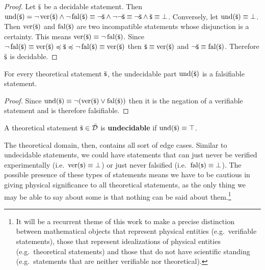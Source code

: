 \begin{mathSection}
\begin{proof}
			Let $\bar{\mathsf{s}}$ be a decidable statement. Then $\operatorname{und}(\bar{\mathsf{s}}) = \neg \operatorname{ver}(\bar{\mathsf{s}}) \wedge \neg \operatorname{fal}(\bar{\mathsf{s}}) \equiv \neg \bar{\mathsf{s}} \wedge \neg \neg \bar{\mathsf{s}} \equiv \neg \bar{\mathsf{s}} \wedge \bar{\mathsf{s}} \equiv \bot$. Conversely, let $\operatorname{und}(\bar{\mathsf{s}}) \equiv \bot$. Then $\operatorname{ver}(\bar{\mathsf{s}})$ and $\operatorname{fal}(\bar{\mathsf{s}})$ are two incompatible statements whose disjunction is a certainty. This means $\operatorname{ver}(\bar{\mathsf{s}}) \equiv \neg \operatorname{fal}(\bar{\mathsf{s}})$. Since $\neg \operatorname{fal}(\bar{\mathsf{s}}) \equiv \operatorname{ver}(\bar{\mathsf{s}}) \preccurlyeq \bar{\mathsf{s}} \preccurlyeq \neg \operatorname{fal}(\bar{\mathsf{s}}) \equiv \operatorname{ver}(\bar{\mathsf{s}})$ then $\bar{\mathsf{s}} \equiv \operatorname{ver}(\bar{\mathsf{s}})$ and $\neg\bar{\mathsf{s}} \equiv \operatorname{fal}(\bar{\mathsf{s}})$. Therefore $\bar{\mathsf{s}}$ is decidable.	
		\end{proof}
		
		\begin{coro}
			For every theoretical statement $\bar{\mathsf{s}}$, the undecidable part $\operatorname{und}(\bar{\mathsf{s}})$ is a falsifiable statement.
		\end{coro}
		
		\begin{proof}
			Since $\operatorname{und}(\bar{\mathsf{s}}) \equiv \neg (\operatorname{ver}(\bar{\mathsf{s}}) \vee \operatorname{fal}(\bar{\mathsf{s}}))$ then it is the negation of a verifiable statement and is therefore falsifiable.
		\end{proof}
		
		\begin{defn}
			A theoretical statement $\bar{\mathsf{s}} \in \bar{\mathcal{D}}$ is \textbf{undecidable} if $\operatorname{und}(\bar{\mathsf{s}}) \equiv \top$.
		\end{defn}
	\end{mathSection}
	
	The theoretical domain, then, contains all sort of edge cases. Similar to undecidable statements, we could have statements that can just never be verified experimentally (i.e.~$\operatorname{ver}(\mathsf{s}) \equiv \bot$) or just never falsified (i.e.~$\operatorname{fal}(\mathsf{s}) \equiv \bot$). The possible presence of these types of statements means we have to be cautious in giving physical significance to all theoretical statements, as the only thing we may be able to say about some is that nothing can be said about them.\footnote{It will be a recurrent theme of this work to make a precise distinction between mathematical objects that represent physical entities (e.g.~verifiable statements), those that represent idealizations of physical entities (e.g.~theoretical statements) and those that do not have scientific standing (e.g.~statements that are neither verifiable nor theoretical).}
	
